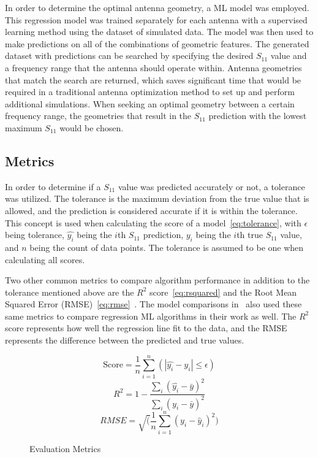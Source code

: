 \documentclass[conference]{IEEEtran}
\begin{document}
In order to determine the optimal antenna geometry, a ML model was employed. This regression model was trained separately for each antenna with a supervised learning method using the dataset of simulated data. The model was then used to make predictions on all of the combinations of geometric features. The generated dataset with predictions can be searched by specifying the desired $S_{11}$ value and a frequency range that the antenna should operate within. Antenna geometries that match the search are returned, which saves significant time that would be required in a traditional antenna optimization method to set up and perform additional simulations. When seeking an optimal geometry between a certain frequency range, the geometries that result in the $S_{11}$ prediction with the lowest maximum $S_{11}$ would be chosen.


\subsection{Metrics}
In order to determine if a $S_{11}$ value was predicted accurately or not, a tolerance was utilized. The tolerance is the maximum deviation from the true value that is allowed, and the prediction is considered accurate if it is within the tolerance. This concept is used when calculating the score of a model~\eqref{eq:tolerance}, with $\epsilon$ being tolerance, $\hat{y_i}$ being the $i$th $S_{11}$ prediction, $y_i$ being the $i$th true $S_{11}$ value, and $n$ being the count of data points. The tolerance is assumed to be one when calculating all scores.

Two other common metrics to compare algorithm performance in addition to the tolerance mentioned above are the $R^2$ score~\eqref{eq:rsquared} and the Root Mean Squared Error (RMSE)~\eqref{eq:rmse}~\cite{shcherbakov_survey_2013}. The model comparisons in~\cite{haque_machine_2023,m_el-kenawy_optimized_2022,ranjan_ultra-wideband_2022,sharma_machine_2020,jain_estimation_2022,jain_design_2024} also used these same metrics to compare regression ML algorithms in their work as well. The $R^2$ score represents how well the regression line fit to the data, and the RMSE represents the difference between the predicted and true values.

\begin{figure}[h]
    \begin{equation}
        \text{Score} = \frac{1}{n} \sum_{i=1}^{n}(\left|\hat{y_i} - y_i\right| \leq \epsilon)
        \label{eq:tolerance}
    \end{equation}
    \begin{equation}
        R^2 = 1 - \frac{\sum_{i}(\hat{y_i} - \bar{y})^2}{\sum_{i}(y_i - \bar{y})^2}
        \label{eq:rsquared}
    \end{equation}
    \begin{equation}
        {RMSE} = \sqrt(\frac{1}{n} \sum_{i=1}^{n}(y_i - \hat{y}_i)^2)
        \label{eq:rmse}
    \end{equation}
    \caption{Evaluation Metrics}
\end{figure}
\end{document}
